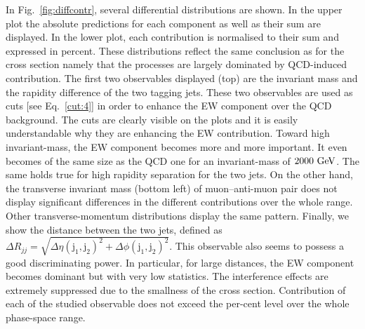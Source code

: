 \documentclass[11pt]{cernrep}
\begin{document}
In Fig.~\ref{fig:diffcontr}, several differential distributions are shown.
In the upper plot the absolute predictions for each component as well as their sum are displayed.
In the lower plot, each contribution is normalised to their sum and expressed in percent.
These distributions reflect the same conclusion as for the cross section namely that the processes are largely dominated by QCD-induced contribution.
The first two observables displayed (top) are the invariant mass and the rapidity difference of the two tagging jets.
These two observables are used as cuts [see Eq.~\eqref{cut:4}] in order to enhance the EW component over the QCD background.
The cuts are clearly visible on the plots and it is easily understandable why they are enhancing the EW contribution.
Toward high invariant-mass, the EW component becomes more and more important.
It even becomes of the same size as the QCD one for an invariant-mass of $2000{\rm~GeV}$.
The same holds true for high rapidity separation for the two jets.
On the other hand, the transverse invariant mass (bottom left) of muon--anti-muon pair does not display significant differences in the different contributions over the whole range.
Other transverse-momentum distributions display the same pattern.
Finally, we show the distance between the two jets, 
defined as $\Delta R_{jj} = \sqrt{\Delta\eta(\mathrm{j}_{1}, \mathrm{j}_{2})^2 + \Delta\phi(\mathrm{j}_{1}, \mathrm{j}_{2})^2}$.
This observable also seems to possess a good discriminating power.
In particular, for large distances, the EW component becomes dominant but with very low statistics.
The interference effects are extremely suppressed due to the smallness of the cross section.
Contribution of each of the studied observable does not exceed the per-cent level over the whole phase-space range.
\end{document}
